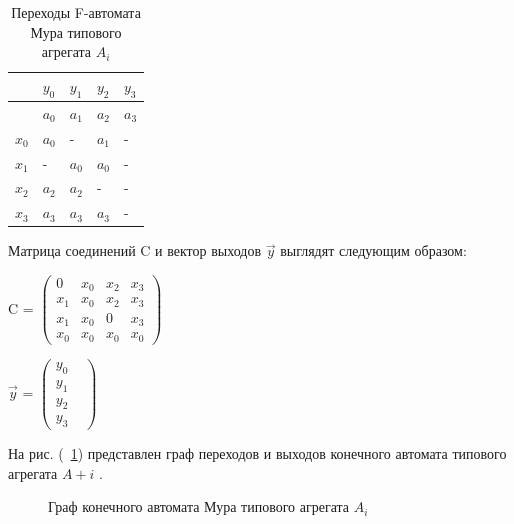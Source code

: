 \documentclass[12pt]{article}
\begin{document}
\begin{table}
\caption{Переходы F-автомата Мура типового агрегата ${A_i}$}
\center
\begin{tabular}{ || l | l | l | l | l || }

\hline
 & ${y_0}$ & ${y_1}$ & ${y_2}$ & ${y_3}$ \\ \hline
  & ${a_0}$ & ${a_1}$ & ${a_2}$ & ${a_3}$ \\ \hline
 ${x_0}$&${a_0}$ & - & ${a_1}$ & - \\ \hline
${x_1}$&- & ${a_0}$ & ${a_0}$ & -  \\ \hline
${x_2}$&${a_2}$ & ${a_2}$ & - &  -\\ \hline
${x_3}$&${a_3}$ & ${a_3}$ & ${a_3}$& - \\ \hline
\hline
\end{tabular}
\label{10}
\end{table}

Матрица соединений C и вектор выходов $\overrightarrow{y}$
 выглядят следующим образом:


C =
$\begin{pmatrix}
 0 & x_{0} & x_{2} & x_{3} \\
x_{1} & x_{0} &  x_{2} &  x_{3} \\
x_{1} &  x_{0} & 0 &  x_{3} \\
x_{0} &  x_{0} &  x_{0} &  x_{0} 
\end{pmatrix}$

$\overrightarrow{y}$ =
$\begin{pmatrix}
 y_{0} &  \\
y_{1}  \\
y_{2}  \\
y_{3}  
\end{pmatrix}$

На рис. (~\ref{8}) представлен граф переходов и выходов конечного автомата типового агрегата ${A+i}$ .

\begin{figure}
\caption{Граф конечного автомата Мура
типового агрегата ${A_i}$}
\label{8}
\end{figure}
\end{document}
